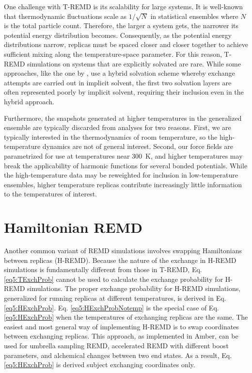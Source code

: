 One challenge with T-REMD is its scalability for large systems. It is well-known
that thermodynamic fluctuations scale as $1/\sqrt{N}$ in statistical ensembles
where $N$ is the total particle count. Therefore, the larger a system gets, the
narrower its potential energy distribution becomes. Consequently, as the
potential energy distributions narrow, replicas must be spaced closer and closer
together to achieve sufficient mixing along the temperature-space parameter. For
this reason, T-REMD simulations on systems that are explicitly solvated are
rare. While some approaches, like the one by \citeauthor{Okur2006}, use a hybrid
solvation scheme whereby exchange attempts are carried out in implicit solvent,
the first two solvation layers are often represented poorly by implicit solvent,
requiring their inclusion even in the hybrid approach. \cite{Okur2006}

Furthermore, the snapshots generated at higher temperatures in the generalized
ensemble are typically discarded from analyses for two reasons. First, we are
typically interested in the thermodynamics of room temperature, so the
high-temperature dynamics are not of general interest. Second, our force fields
are parametrized for use at temperatures near \mbox{300 K}, and higher
temperatures may break the applicability of harmonic functions for several
bonded potentials. While the high-temperature data may be reweighted for
inclusion in low-temperature ensembles,
\cite{Chodera_JChemTheoryComput_2007_v3_p26} higher temperature replicas
contribute increasingly little information to the temperatures of interest.

\section{Hamiltonian REMD}

Another common variant of REMD simulations involves swapping Hamiltonians
between replicas (H-REMD). Because the nature of the exchange in H-REMD
simulations is fundamentally different from those in T-REMD, Eq.
\ref{eq5:TExchProb} cannot be used to calculate the exchange probability for
H-REMD simulations. The proper exchange probability for H-REMD simulations,
generalized for running replicas at different temperatures, is derived in Eq.
\ref{eq5:HExchProb}. Eq. \ref{eq5:HExchProbNotemp} is the special case of Eq.
\ref{eq5:HExchProb} when the temperatures of exchanging replicas are the same.
The easiest and most general way of implementing H-REMD is to swap coordinates
between exchanging replicas. This approach, as implemented in Amber, can be used
for umbrella sampling REMD, \cite{Babin_JChemPhys_2008_v128_p134101,
Sugita_JChemPhys_2000_v113_p6042} accelerated REMD with different boost
parameters, \cite{Fajer_JComputChem_2009_v30_p1719,
Arrar_JChemTheoryComput_2013_v9_p18} and alchemical changes between two end
states. \cite{Meng_JChemTheoryComput_2011_v7_p2721} As a result, Eq.
\ref{eq5:HExchProb} is derived subject exchanging coordinates only.

